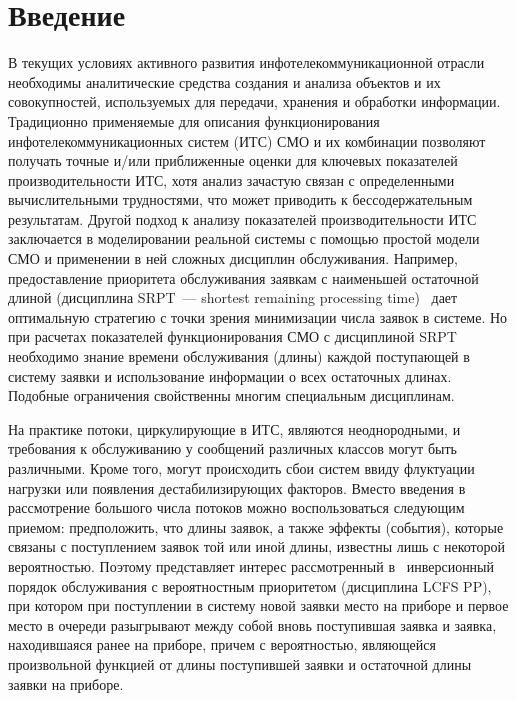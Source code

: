 



\thispagestyle{headings}

\begin{multicols}{2}

\label{st\stat}


\section{Введение}

В текущих условиях активного развития
инфотелекоммуникационной отрасли необходимы
аналитические средства создания и анализа
объектов и их совокупностей, используемых для
передачи, хранения и обработки информации.
Традиционно применяемые для описания
функционирования инфотелекоммуникационных
систем (ИТС) СМО
и их комбинации позволяют получать точные
и/или приближенные оценки для ключевых
показателей производительности ИТС, хотя анализ
зачастую связан с определенными
вычислительными трудностями, что может приводить
к бессодержательным результатам.
Другой подход к анализу показателей производительности
ИТС заключается в моделировании реальной системы
с помощью простой модели СМО и применении в ней
сложных дисциплин обслуживания.
Например, предоставление приоритета обслуживания
заявкам с наименьшей остаточной длиной (дисциплина
{SRPT}~--- shortest remaining processing time)~\cite{shrage} дает оптимальную стратегию
с точки зрения минимизации числа заявок в системе.
Но при расчетах показателей функционирования СМО
с дисциплиной {SRPT} необходимо знание времени
обслуживания (длины) каждой поступающей в систему
заявки и использование информации о всех остаточных
длинах.
Подобные ограничения свойственны многим специальным
дисциплинам.

На практике потоки, циркулирующие в ИТС, являются
неоднородными, и требования к обслуживанию у
сообщений различных классов могут быть различными.
Кроме того, могут происходить сбои систем ввиду
флуктуации нагрузки
или появления дестабилизирующих факторов.
Вместо введения в рассмотрение большого числа потоков
можно воспользоваться следующим приемом:
предположить, что длины заявок, а также эффекты
(события), которые связаны с поступлением заявок
той или иной длины, известны лишь с
некоторой вероятностью.
Поэтому представляет интерес рассмотренный в~\cite{aaa1} инверсионный порядок обслуживания с
вероятностным приоритетом (дис\-цип\-ли\-на {LCFS PP}),
при котором при поступлении в систему новой заявки
место на приборе и первое место в очереди
разыг\-ры\-ва\-ют между собой вновь поступившая заявка
и заявка, находившаяся ранее на приборе, причем
с вероятностью, являющейся произвольной функцией
от длины поступившей заявки и остаточной длины
заявки на приборе.



\end{multicols}
